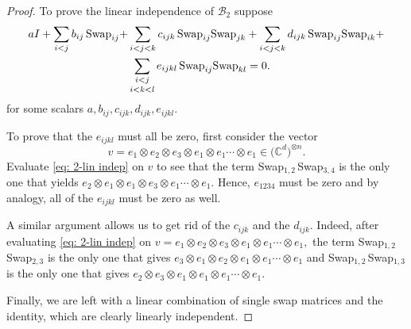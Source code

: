 \documentclass[12pt,dvipsnames,accepted=2016-08-18,a4paper,onecolumn]{quantumarticle}
\numberwithin{equation}{section}
\theoremstyle{definition}
\begin{document}
\begin{proof}
	To prove the linear independence of $\mathcal{B}_2$ suppose 
	\begin{equation}\label{eq: 2-lin indep}
	\begin{split}
		a I + \sum_{i<j}b_{ij}\,\textnormal{Swap}_{ij} + 
		&\sum_{i<j<k}c_{ijk}\,\textnormal{Swap}_{ij}\textnormal{Swap}_{jk} +
		\sum_{i<j<k}d_{ijk}\,\textnormal{Swap}_{ij}\textnormal{Swap}_{ik} +	\\	
		&\sum_{\substack{i<j \\[.5mm] i<k<l}}e_{ijkl}\,\textnormal{Swap}_{ij}\textnormal{Swap}_{kl} = 0.
	\end{split}
\end{equation}
for some scalars $a,b_{ij},c_{ijk},d_{ijk},e_{ijkl}.$ 

To prove that the $e_{ijkl}$ must all be zero, first consider the vector 
$$v = e_1 \otimes e_2 \otimes e_3 \otimes e_1 \otimes e_1 \cdots \otimes e_1 \in \big(\mathbb{C}^d\big)^{\otimes n}.$$
 Evaluate \eqref{eq: 2-lin indep} on $v$ to see that the term Swap$_{1,2}$\,Swap$_{3,4}$ is the only one that yields $e_2 \otimes e_1 \otimes e_1 \otimes e_3 \otimes e_1 \cdots \otimes e_1.$ Hence, $e_{1234}$ must be zero and by analogy, all of the $e_{ijkl}$ must be zero as well.

A similar argument allows us to get rid of the $c_{ijk}$ and the $d_{ijk}.$ Indeed, after evaluating \eqref{eq: 2-lin indep} on $v = e_1 \otimes e_2 \otimes e_3 \otimes e_1 \otimes e_1 \cdots \otimes e_1,$ the term Swap$_{1,2}$\,Swap$_{2,3}$ is the only one that gives
$e_3 \otimes e_1 \otimes e_2 \otimes e_1 \otimes e_1 \cdots \otimes e_1$ and Swap$_{1,2}$\,Swap$_{1,3}$ is the only one that gives
$e_2 \otimes e_3 \otimes e_1 \otimes e_1 \otimes e_1 \cdots \otimes e_1.$

Finally, we are left with a linear combination of single swap matrices and the identity, which are clearly linearly independent.
\end{proof}
\end{document}
